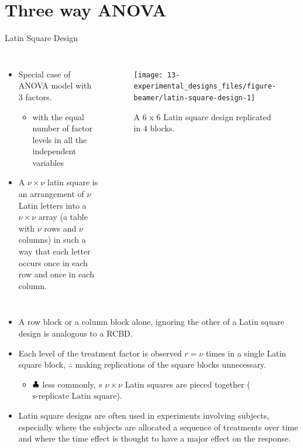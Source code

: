 \documentclass[
  ignorenonframetext,
  aspectratio=169]{beamer}
\providecommand{\tightlist}{%
  \setlength{\itemsep}{0pt}\setlength{\parskip}{0pt}}
\newcommand{\bcolumns}{\begin{columns}[T, onlytextwidth]}
\newcommand{\ecolumns}{\end{columns}}
\begin{document}
\hypertarget{three-way-anova}{%
\section{Three way ANOVA}\label{three-way-anova}}

\begin{frame}{Latin Square Design}
\protect\hypertarget{latin-square-design}{}
\bcolumns
{}
\small

\begin{itemize}
\tightlist
\item
  Special case of ANOVA model with 3 factors.

  \begin{itemize}
  \tightlist
  \item
    with the equal number of factor levels in all the independent
    variables
  \end{itemize}
\item
  A \(\nu \times \nu\) latin square is an arrangement of \(\nu\) Latin
  letters into a \(\nu \times \nu\) array (a table with \(\nu\) rows and
  \(\nu\) columns) in such a way that each letter occurs once in each
  row and once in each column.
\end{itemize}


\begin{figure}
\texttt{[image: 13-experimental\_designs\_files/figure-beamer/latin-square-design-1]} \caption{A 6 x 6 Latin square design replicated in 4 blocks.}\label{fig:latin-square-design}
\end{figure}

\ecolumns
\end{frame}

\begin{frame}{}
\protect\hypertarget{section-16}{}
\begin{itemize}
\tightlist
\item
  A row block or a column block alone, ignoring the other of a Latin
  square design is analogous to a RCBD.
\item
  Each level of the treatment factor is observed \(r = \nu\) times in a
  single Latin square block, \(\therefore\) making replications of the
  square blocks unnecessary.

  \begin{itemize}
  \tightlist
  \item
    \(\Large \clubsuit\) less commonly, \(s\) \(\nu \times \nu\) Latin
    squares are pieced together (\(\textrm{s-replicate Latin square}\)).
  \end{itemize}
\item
  Latin square designs are often used in experiments involving subjects,
  especially where the subjects are allocated a sequence of treatments
  over time and where the time effect is thought to have a major effect
  on the response.
\end{itemize}
\end{frame}
\end{document}
